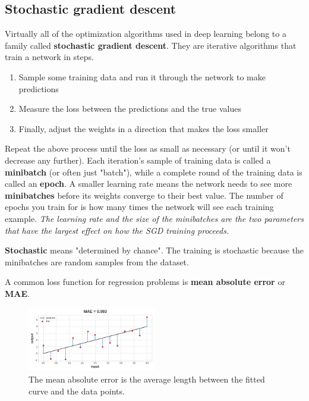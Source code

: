 \subsection{Stochastic gradient descent}
\noindent Virtually all of the optimization algorithms used in deep learning
belong to a family called \textbf{stochastic gradient descent}. They are
iterative algorithms that train a network in steps.
\begin{enumerate}
	\item Sample some training data and run it through the network to make
		predictions
	\item Measure the loss between the predictions and the true values
	\item Finally, adjust the weights in a direction that makes the loss smaller
\end{enumerate}

\noindent Repeat the above process until the loss as small as necessary (or until
it won't decrease any further). Each iteration's sample of training data is called
a \textbf{minibatch} (or often just "batch"), while a complete round of the training data
is called an \textbf{epoch}. A smaller learning rate means the network needs to see
more \textbf{minibatches} before its weights converge to their best value.
The number of epochs you train for is how many times the network will see each
training example. \emph{The learning rate and the size of the minibatches are the two
parameters that have the largest effect on how the SGD training proceeds.}

\noindent \textbf{Stochastic} means "determined by chance". The training is stochastic
because the minibatches are random samples from the dataset.

\noindent A common loss function for regression problems is \textbf{mean absolute
error} or \textbf{MAE}.

\begin{figure}[htp]
	\centering
	\includegraphics[width=0.5\textwidth]{../assets/machine_learning_random/mean_absolute_error.png}
	\caption{The mean absolute error is the average length between the fitted curve and the data points.}
\end{figure}

